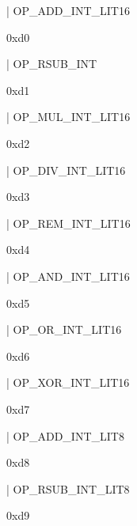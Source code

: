\documentclass[11pt]{article}
\begin{document}
\begin{ocamldoccode}
  | OP_ADD_INT_LIT16
\end{ocamldoccode}
\begin{ocamldoccomment}
0xd0
\end{ocamldoccomment}
\begin{ocamldoccode}
  | OP_RSUB_INT
\end{ocamldoccode}
\begin{ocamldoccomment}
0xd1
\end{ocamldoccomment}
\begin{ocamldoccode}
  | OP_MUL_INT_LIT16
\end{ocamldoccode}
\begin{ocamldoccomment}
0xd2
\end{ocamldoccomment}
\begin{ocamldoccode}
  | OP_DIV_INT_LIT16
\end{ocamldoccode}
\begin{ocamldoccomment}
0xd3
\end{ocamldoccomment}
\begin{ocamldoccode}
  | OP_REM_INT_LIT16
\end{ocamldoccode}
\begin{ocamldoccomment}
0xd4
\end{ocamldoccomment}
\begin{ocamldoccode}
  | OP_AND_INT_LIT16
\end{ocamldoccode}
\begin{ocamldoccomment}
0xd5
\end{ocamldoccomment}
\begin{ocamldoccode}
  | OP_OR_INT_LIT16
\end{ocamldoccode}
\begin{ocamldoccomment}
0xd6
\end{ocamldoccomment}
\begin{ocamldoccode}
  | OP_XOR_INT_LIT16
\end{ocamldoccode}
\begin{ocamldoccomment}
0xd7
\end{ocamldoccomment}
\begin{ocamldoccode}
  | OP_ADD_INT_LIT8
\end{ocamldoccode}
\begin{ocamldoccomment}
0xd8
\end{ocamldoccomment}
\begin{ocamldoccode}
  | OP_RSUB_INT_LIT8
\end{ocamldoccode}
\begin{ocamldoccomment}
0xd9
\end{ocamldoccomment}
\end{document}
